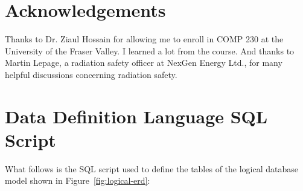 \documentclass[12pt,a4paper]{article}
\begin{document}
\section{Acknowledgements}

Thanks to Dr. Ziaul Hossain for allowing me to enroll in COMP 230 at the University of the Fraser Valley. I learned a lot from the course. And thanks to Martin Lepage, a radiation safety officer at NexGen Energy Ltd., for many helpful discussions concerning radiation safety.

\appendix
\section{Data Definition Language SQL Script}
\label{app:ddl}

What follows is the SQL script used to define the tables of the logical database model
shown in Figure~\ref{fig:logical-erd}:
\end{document}
